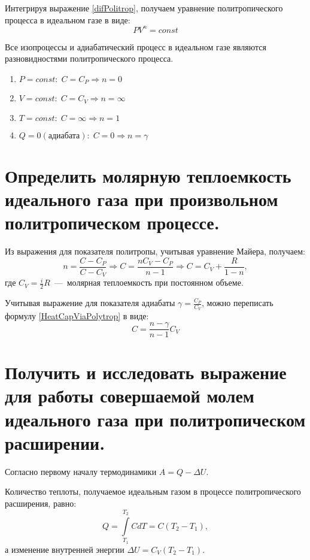Интегрируя выражение \ref{difPolitrop}, получаем уравнение политропического процесса в
идеальном газе в виде:
\begin{equation}
  PV^n = const
\end{equation}

Все изопроцессы и адиабатический процесс в идеальном газе являются
разновидностями политропического процесса.
\begin{enumerate}
  \item $P = const: \; C = C_P \Rightarrow n = 0$
  \item $V = const: \; C = C_V \Rightarrow n = \infty$
  \item $T = const: \; C = \infty \Rightarrow n = 1$
  \item $Q = 0 (\text{адиабата}): \; C = 0 \Rightarrow n = \gamma$
\end{enumerate}

\section{Определить молярную теплоемкость идеального газа при
произвольном политропическом процессе.}

\solving{}

Из выражения для показателя политропы, учитывая уравнение Майера,
получаем:
\begin{equation}\label{HeatCapViaPolytrop}
  n = \frac{C -C_P}{C - C_V} \Rightarrow C = \frac{nC_V - C_P}{n-1} \Rightarrow C = C_V + \frac{R}{1-n}, 
\end{equation}
где $C_V = \frac{i}{2}R$~---~молярная теплоемкость при постоянном объеме.

Учитывая выражение для показателя адиабаты $\gamma = \frac{C_P}{C_V}$, можно переписать формулу \ref{HeatCapViaPolytrop} в виде:
\begin{equation}
  C = \frac{n -\gamma}{n -1}C_V
\end{equation}

\section{Получить и исследовать выражение для работы совершаемой
молем идеального газа при политропическом расширении.}

\solving{}

Согласно первому началу термодинамики $A = Q - \Delta U$.

Количество теплоты, получаемое идеальным газом в процессе
политропического расширения, равно:
\begin{equation}
  Q = \int\limits_{T_1}^{T_2} CdT = C(T_2 -T_1),
\end{equation}
а изменение внутренней энергии $\Delta U = C_{V}(T_{2} - T_{1})$.

